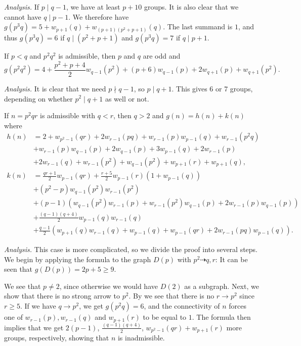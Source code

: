 \textit{Analysis.} If $p \mid q - 1$, we have at least $p + 10$ groups.
It is also clear that we cannot have $q \mid p - 1$.
We therefore have $g(p^3 q) = 5 + w_{p + 1}(q) + w_{(p + 1)(p^2 + p + 1)}(q)$.
The last summand is $1$, and thus $g(p^3 q) = 6$ if $q \mid (p^2 + p + 1)$ and $g(p^3 q) = 7$ if $q \mid p + 1$.

\begin{eufact}
	If $p < q$ and $p^2 q^2$ is admissible, then $p$ and $q$ are odd and
	\[g(p^2 q^2) = 4 + \frac{p^2 + p + 4}{2} w_{q - 1}(p^2) + (p + 6)w_{q - 1}(p) + 2w_{q + 1}(p) + w_{q + 1}(p^2).\]
\end{eufact}

\textit{Analysis.} It is clear that we need $p \nmid q - 1$, so $p \mid q + 1$.
This gives 6 or 7 groups, depending on whether $p^2 \mid q + 1$ as well or not.

\begin{eufact} 
	If $n = p^2 q r$ is admissible with $q < r$, then $q > 2$ and $g(n) = h(n) + k(n)$ where$$\begin{aligned}
		h(n) &= 2 + w_{p^2 - 1}(qr) + 2w_{r - 1}(pq) + w_{r - 1}(p)w_{p - 1}(q) + w_{r - 1}(p^2 q) \\ 
		&+ w_{r - 1}(p)w_{q - 1}(p) + 2w_{q - 1}(p) + 3w_{p - 1}(q) + 2w_{r - 1}(p) \\ 
		&+ 2w_{r - 1}(q) + w_{r - 1}(p^2) + w_{q - 1}(p^2) + w_{p + 1}(r) + w_{p + 1}(q), \\
		k(n) &= \frac{qr + 1}{2} w_{p - 1}(qr) + \frac{r + 5}{2} w_{p - 1}(r)(1 + w_{p - 1}(q))\\
		&+ (p^2 - p)w_{q - 1}(p^2)w_{r - 1}(p^2) \\
		&+ (p - 1)(w_{q - 1}(p^2)w_{r - 1}(p) + w_{r - 1}(p^2)w_{q - 1}(p) + 2w_{r - 1}(p)w_{q - 1}(p)) \\
		&+ \frac{(q - 1)(q + 4)}{2} w_{p - 1}(q)w_{r - 1}(q) \\
		&+ \frac{q - 1}{2} (w_{p + 1}(q)w_{r - 1}(q) + w_{p - 1}(q) + w_{p - 1}(qr) + 2w_{r - 1}(pq)w_{p - 1}(q)).
	\end{aligned}$$
\end{eufact}

\textit{Analysis.} This case is more complicated, so we divide the proof into several steps.
We begin by applying the formula to the graph $D(p)$ with $p^2 \dashrightarrow q, r$: It can be seen that $g(D(p)) = 2p + 5 \ge 9$.

We see that $p \neq 2$, since otherwise we would have $D(2)$ as a subgraph.
Next, we show that there is no strong arrow to $p^2$.
By  we see that there is no $r \rightarrow p^2$ since $r \ge 5$.
If we have $q \rightarrow p^2$, we get $g(p^2 q) = 6$, and the connectivity of $n$ forces one of $w_{r - 1}(p), w_{r - 1}(q)$ and $w_{p + 1}(r)$ to be equal to $1$.
The formula then implies that we get
$2(p - 1)$, $\frac{(q - 1)(q + 4)}{2}$,  $w_{p^2 - 1}(qr) + w_{p + 1}(r)$
more groups, respectively, showing that $n$ is inadmissible.


